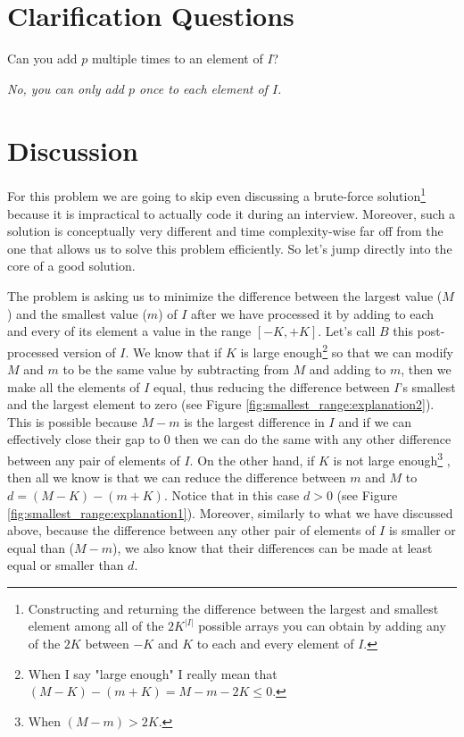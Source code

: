 \section{Clarification Questions}

\begin{QandA}
	\item Can you add $p$ multiple times to an element of $I$?
	\begin{answered}
		\textit{No, you can only add $p$ once to each element of $I$.}
	\end{answered}	
\end{QandA}

\section{Discussion}
\label{smallest_range:sec:discussion}
For this problem we are going to skip even discussing a brute-force solution\footnote{Constructing
	and returning the difference between the largest and smallest element among all of the
	$2K^{|I|}$ possible arrays you can obtain by adding any of the $2K$ between $-K$ and $K$ to each
	and every element of $I$.} because it is impractical to actually code it during an interview.
	Moreover, such a solution is conceptually very different and time complexity-wise far off from
	the one that allows us to solve this problem efficiently. So let's jump directly into the core
	of a good solution.

The problem is asking us to minimize the difference between the largest value ($M$) and the smallest
value ($m$) of $I$ after we have processed it by adding to each and every of its element a value in
the range $[-K,+K]$. Let's call $B$ this post-processed version of $I$. We know that if $K$ is large
enough\footnote{When I say "large enough" I really mean that $(M-K) - (m+K) = M-m-2K \leq 0$.} so
that we can modify $M$ and $m$ to be the same value by subtracting from $M$ and adding to $m$, then
we make all the elements of $I$ equal, thus reducing the difference between $I$'s smallest and the
largest element to zero (see Figure \ref{fig:smallest_range:explanation2}). This is possible because
$M-m$ is the  largest difference in $I$ and if we can effectively close their gap to $0$ then we can
do the same with any other difference between any pair of elements of $I$. On the other hand, if $K$
is not large enough\footnote{When $(M-m) > 2K$.} , then all we know is that we can reduce the
difference between $m$ and $M$ to $d=(M-K)-(m+K)$. Notice that in this case $d > 0$  (see Figure
\ref{fig:smallest_range:explanation1}). Moreover, similarly to what we have discussed above, because
the difference between any other pair of elements of $I$ is smaller or equal than ($M-m$), we also
know that their differences can be made at least equal or smaller than $d$.


